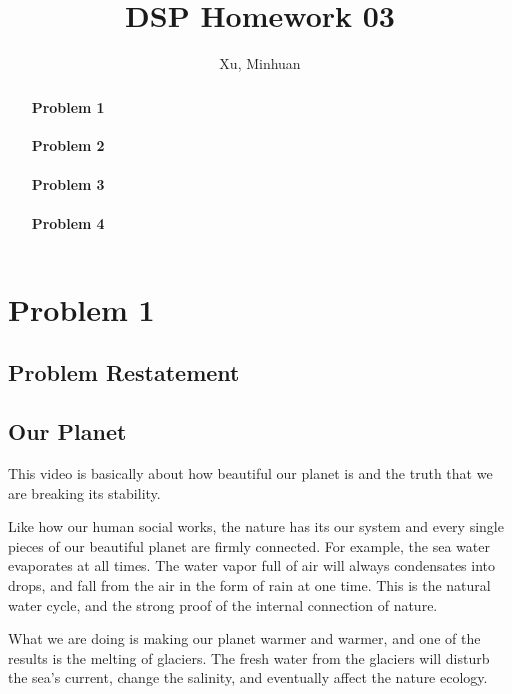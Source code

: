 \documentclass{article}
\begin{document}
\title{DSP Homework 03}
\author{Xu, Minhuan}
\maketitle
\tableofcontents

\begin{abstract}
    \subsubsection*{Problem 1}
    
    \subsubsection*{Problem 2}

    \subsubsection*{Problem 3}

    \subsubsection*{Problem 4}

\end{abstract}

\section{Problem 1}
\subsection*{Problem Restatement}
\subsection{Our Planet}

This video is basically about how beautiful our planet is and the truth that we are breaking its stability.

Like how our human social works, the nature has its our system and every single pieces of our beautiful planet are firmly connected. For example, the sea water evaporates at all times. The water vapor full of air will always condensates into drops, and fall from the air in the form of rain at one time. This is the natural water cycle, and the strong proof of the internal connection of nature.

What we are doing is making our planet warmer and warmer, and one of the results is the melting of glaciers. The fresh water from the glaciers will disturb the sea's current, change the salinity, and eventually affect the nature ecology.
\end{document}

